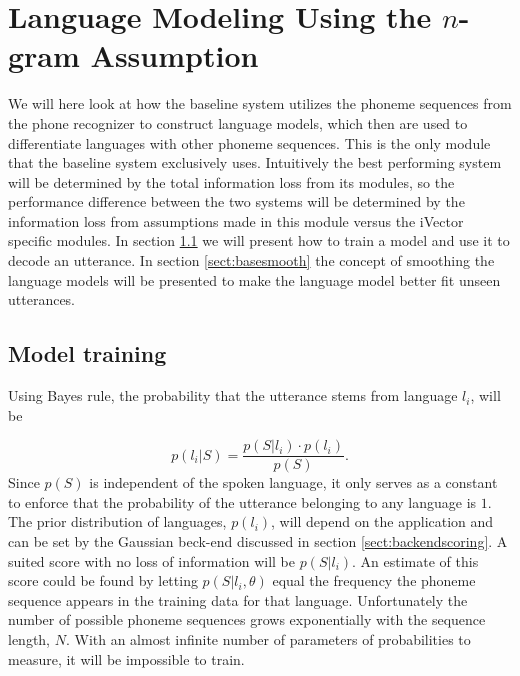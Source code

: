 \chapter{Language Modeling Using the $n$-gram Assumption}
\label{sect:baselinetheory}

We will here look at how the baseline system utilizes the phoneme sequences from the phone recognizer to construct language models, which then are used to differentiate languages with other phoneme sequences. This is the only module that the baseline system exclusively uses. Intuitively the best performing system will be determined by the total information loss from its modules, so the performance difference between the two systems will be determined by the information loss from assumptions made in this module versus the iVector specific modules. In section \ref{sect:basetrain} we will present how to train a model and use it to decode an utterance. In section \ref{sect:basesmooth} the concept of smoothing the language models will be presented to make the language model better fit unseen utterances.

\section{Model training}
\label{sect:basetrain}

Using Bayes rule, the probability that the utterance stems from language $l_i$, will be

\begin{equation}
\label{basebayes}
p(l_i|S) = \frac{p(S|l_i) \cdot p(l_i)}{p(S)}.
\end{equation}
Since $p(S)$ is independent of the spoken language, it only serves as a constant to enforce that the probability of the utterance belonging to any language is $1$. The prior distribution of languages, $p(l_i)$, will depend on the application and can be set by the Gaussian beck-end discussed in section \ref{sect:backendscoring}. A suited score with no loss of information will be $p(S|l_i)$. An estimate of this score could be found by letting $p(S|l_i, \theta)$ equal the frequency the phoneme sequence appears in the training data for that language. Unfortunately the number of possible phoneme sequences grows exponentially with the sequence length, $N$. With an almost infinite number of parameters of probabilities to measure, it will be impossible to train. 

